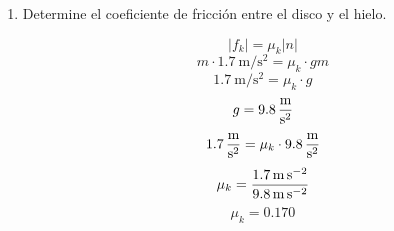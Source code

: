 \documentclass[../practica.root.tex]{subfiles}
\begin{document}
\begin{enumerate}
\begin{enumerate}
		      \item Determine el coeficiente de fricción entre el disco y el hielo.

		            \[ |f_k| = \mu_k|n| \]
		            \[ m\cdot \SI[per-mode=fraction]{1,7}{\meter\per\second\squared} = \mu_k\cdot gm \]
		            \[ \SI[per-mode=fraction]{1,7}{\meter\per\second\squared} = \mu_k\cdot g \]
		            \[ g = \gravity \]
		            \[ \SI[per-mode=fraction]{1,7}{\meter\per\second\squared} = \mu_k\cdot\gravity \]
		            \[ \mu_k = \frac{
				            \SI{1,7}{\meter\per\second\squared}
			            }{
				            \gravity[per-mode=reciprocal]
			            } \]
		            \[ \boxed{\mu_k = \num{0,170}} \]

	      \end{enumerate}


\end{enumerate}
\end{document}
